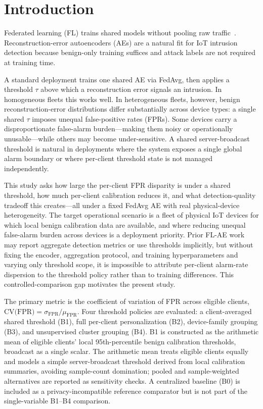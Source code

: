 \section{Introduction}
\label{sec:introduction}

Federated learning (FL) trains shared models without pooling raw traffic~\cite{mcmahan2017communication}.
Reconstruction-error autoencoders (AEs) are a natural fit for IoT intrusion detection
because benign-only training suffices and attack labels are not required at training time.

A standard deployment trains one shared AE via FedAvg, then applies a threshold $\tau$
above which a reconstruction error signals an intrusion.
In homogeneous fleets this works well.
In heterogeneous fleets, however, benign reconstruction-error distributions differ
substantially across device types: a single shared $\tau$ imposes unequal false-positive
rates (FPRs).
Some devices carry a disproportionate false-alarm burden---making them noisy
or operationally unusable---while others may become under-sensitive.
A shared server-broadcast threshold is natural in deployments where the system
exposes a single global alarm boundary or where per-client threshold state is
not managed independently.

This study asks how large the per-client FPR disparity is under a shared threshold,
how much per-client calibration reduces it, and what detection-quality tradeoff
this creates---all under a fixed FedAvg AE with real physical-device heterogeneity.
The target operational scenario is a fleet of physical IoT devices for which
local benign calibration data are available, and where reducing unequal
false-alarm burden across devices is a deployment priority.
Prior FL-AE work may report aggregate detection metrics or use thresholds implicitly,
but without fixing the encoder, aggregation protocol, and training hyperparameters and
varying only threshold scope, it is impossible to attribute per-client alarm-rate
dispersion to the threshold policy rather than to training differences.
This controlled-comparison gap motivates the present study.

The primary metric is the coefficient of variation of FPR across eligible clients,
$\text{CV(FPR)} = \sigma_{\text{FPR}} / \mu_{\text{FPR}}$.
Four threshold policies are evaluated: a client-averaged shared threshold (B1), full per-client
personalization (B2), device-family grouping (B3), and unsupervised cluster grouping (B4).
B1 is constructed as the arithmetic mean of eligible clients' local 95th-percentile
benign calibration thresholds, broadcast as a single scalar.
The arithmetic mean treats eligible clients equally and models a simple server-broadcast
threshold derived from local calibration summaries, avoiding sample-count domination;
pooled and sample-weighted alternatives are reported as sensitivity checks.
A centralized baseline (B0) is included as a privacy-incompatible reference
comparator but is not part of the single-variable B1--B4 comparison.

